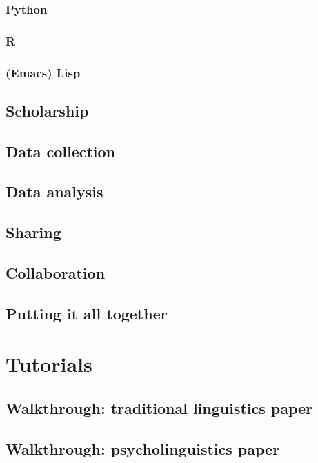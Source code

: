 \documentclass[11pt]{book}
\begin{document}
\section{Python}
\label{sec-2-2-5}
\section{R}
\label{sec-2-2-6}
\section{(Emacs) Lisp}
\label{sec-2-2-7}
\chapter{Scholarship}
\label{sec-2-3}
\chapter{Data collection}
\label{sec-2-4}
\chapter{Data analysis}
\label{sec-2-5}
\chapter{Sharing}
\label{sec-2-6}
\chapter{Collaboration}
\label{sec-2-7}
\chapter{Putting it all together}
\label{sec-2-8}
\part{Tutorials}
\label{sec-3}
\chapter{Walkthrough: traditional linguistics paper}
\label{sec-3-1}
\chapter{Walkthrough: psycholinguistics paper}
\label{sec-3-2}


\printbibliography
\end{document}
